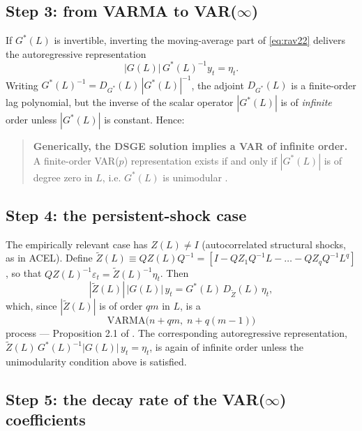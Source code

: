 \subsection{Step 3: from VARMA to VAR($\infty$)}

If $G^{*}(L)$ is invertible, inverting the moving-average part of
\eqref{eq:rav22} delivers the autoregressive representation
\begin{equation}
    |G(L)|\, G^{*}(L)^{-1} y_t = \eta_t .
    \label{eq:rav23}
\end{equation}
Writing $G^{*}(L)^{-1} = D_{G^{*}}(L)\,|G^{*}(L)|^{-1}$, the adjoint
$D_{G^{*}}(L)$ is a finite-order lag polynomial, but the inverse of the
scalar operator $|G^{*}(L)|$ is of \emph{infinite} order unless
$|G^{*}(L)|$ is constant. Hence:

\begin{quote}
\textbf{Generically, the DSGE solution implies a VAR of infinite order.}
A finite-order VAR($p$) representation exists if and only if
$|G^{*}(L)|$ is of degree zero in $L$, i.e. $G^{*}(L)$ is unimodular
\citep[p.~245]{Lutkepohl1993}.
\end{quote}

\subsection{Step 4: the persistent-shock case}

The empirically relevant case has $Z(L) \neq I$ (autocorrelated
structural shocks, as in ACEL). Define
$\widetilde{Z}(L) \equiv Q Z(L) Q^{-1} =
[I - Q Z_1 Q^{-1} L - \dots - Q Z_q Q^{-1} L^q]$, so that
$Q Z(L)^{-1}\varepsilon_t = \widetilde{Z}(L)^{-1}\eta_t$. Then
\begin{equation}
    |\widetilde{Z}(L)|\,|G(L)|\, y_t
    = G^{*}(L)\, D_{\widetilde{Z}}(L)\, \eta_t ,
    \label{eq:rav24}
\end{equation}
which, since $|\widetilde{Z}(L)|$ is of order $qm$ in $L$, is a
\begin{equation}
    \mathrm{VARMA}\big(n + qm,\; n + q(m-1)\big)
\end{equation}
process --- Proposition 2.1 of \citet{Ravenna2007}. The corresponding
autoregressive representation,
$\widetilde{Z}(L)\,G^{*}(L)^{-1}|G(L)|\,y_t = \eta_t$, is again of
infinite order unless the unimodularity condition above is satisfied.

\subsection{Step 5: the decay rate of the VAR($\infty$) coefficients}

